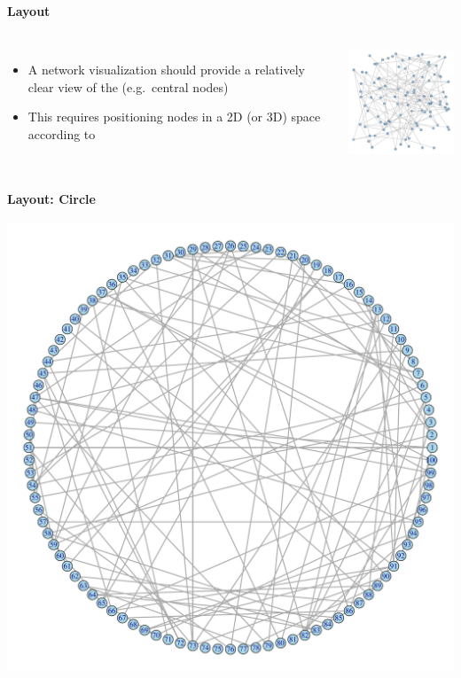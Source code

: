 \documentclass[8pt]{beamer}
\begin{document}
\begin{frame}
\frametitle{\insertsection}
\framesubtitle{Layout}

\begin{columns}
\begin{itemize}
\item A network visualization should provide a relatively clear view of the {\color{blue}{structure of the network}} (e.g.\ central nodes)
\item This requires positioning nodes in a 2D (or 3D) space according to {\color{blue}{certain criteria/rules}}
\end{itemize}

\centering
\includegraphics[width=5cm]{random}\\
   
\end{columns}

\end{frame}


\begin{frame}
\frametitle{\insertsection}
\framesubtitle{Layout: Circle}

\centering
\includegraphics[height=0.85\textheight]{circle}

\end{frame}
\end{document}
